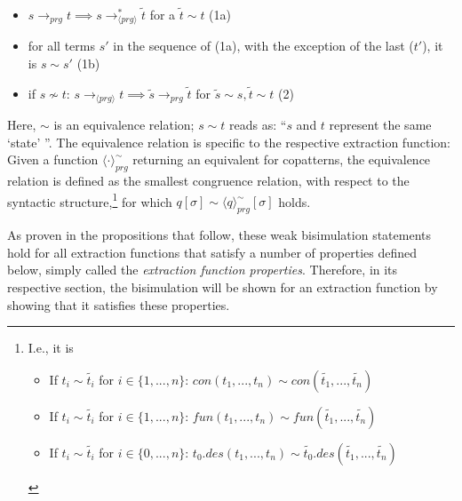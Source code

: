 \begin{itemize}
\item $s \longrightarrow_{prg} t \implies s  \longrightarrow^*_{\langle prg \rangle} \tilde{t}$ for a $\tilde{t} \sim t$ (1a)

\item for all terms $s'$ in the sequence of (1a), with the exception of the last ($t'$), it is $s \sim s'$ (1b)

\item if $s \not\sim t$: $s \longrightarrow_{\langle prg \rangle} t \implies \tilde{s} \longrightarrow_{prg} \tilde{t}$ for $\tilde{s} \sim s, \tilde{t} \sim t$ (2)

\end{itemize}

Here, $\sim$ is an equivalence relation; $s \sim t$ reads as: ``$s$ and $t$ represent the same `state' ''. The equivalence relation is specific to the respective extraction function: Given a function $\langle \cdot \rangle^{\sim}_{prg}$ returning an equivalent for copatterns, the equivalence relation is defined as the smallest congruence relation, with respect to the syntactic structure,\footnote{I.e., it is
\begin{itemize}

\item If $t_i \sim \widetilde{t_i}$ for $i \in \{1, ..., n\}$: $con(t_1, ..., t_n) \sim con(\widetilde{t_1}, ..., \widetilde{t_n})$

\item If $t_i \sim \widetilde{t_i}$ for $i \in \{1, ..., n\}$: $fun(t_1, ..., t_n) \sim fun(\widetilde{t_1}, ..., \widetilde{t_n})$

\item If $t_i \sim \widetilde{t_i}$ for $i \in \{0, ..., n\}$: $t_0.des(t_1, ..., t_n) \sim \widetilde{t_0}.des(\widetilde{t_1}, ..., \widetilde{t_n})$ 

\end{itemize}} for which $q[\sigma] \sim \langle q \rangle^{\sim}_{prg}[\sigma]$ holds.

As proven in the propositions that follow, these weak bisimulation statements hold for all extraction functions that satisfy a number of properties defined below, simply called the \textit{extraction function properties}. Therefore, in its respective section, the bisimulation will be shown for an extraction function by showing that it satisfies these properties.

